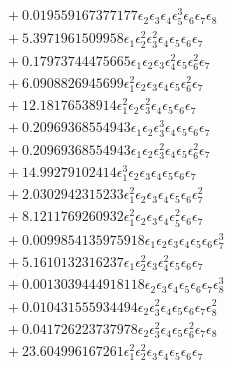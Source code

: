 \documentclass[10pt]{article}
\begin{document}
\begin{align*}
&{}  + 0.019559167377177 \epsilon_{2} \epsilon_{3} \epsilon_{4} \epsilon_{5}^{3} \epsilon_{6} \epsilon_{7} \epsilon_{8} \\
&{}  + 5.3971961509958 \epsilon_{1} \epsilon_{2}^{2} \epsilon_{3}^{2} \epsilon_{4} \epsilon_{5} \epsilon_{6} \epsilon_{7} \\
&{}  + 0.17973744475665 \epsilon_{1} \epsilon_{2} \epsilon_{3} \epsilon_{4}^{2} \epsilon_{5} \epsilon_{6}^{2} \epsilon_{7} \\
&{}  + 6.0908826945699 \epsilon_{1}^{2} \epsilon_{2} \epsilon_{3} \epsilon_{4} \epsilon_{5} \epsilon_{6}^{2} \epsilon_{7} \\
&{}  + 12.18176538914 \epsilon_{1}^{2} \epsilon_{2} \epsilon_{3}^{2} \epsilon_{4} \epsilon_{5} \epsilon_{6} \epsilon_{7} \\
&{}  + 0.20969368554943 \epsilon_{1} \epsilon_{2} \epsilon_{3}^{3} \epsilon_{4} \epsilon_{5} \epsilon_{6} \epsilon_{7} \\
&{}  + 0.20969368554943 \epsilon_{1} \epsilon_{2} \epsilon_{3}^{2} \epsilon_{4} \epsilon_{5} \epsilon_{6}^{2} \epsilon_{7} \\
&{}  + 14.99279102414 \epsilon_{1}^{3} \epsilon_{2} \epsilon_{3} \epsilon_{4} \epsilon_{5} \epsilon_{6} \epsilon_{7} \\
&{}  + 2.0302942315233 \epsilon_{1}^{2} \epsilon_{2} \epsilon_{3} \epsilon_{4} \epsilon_{5} \epsilon_{6} \epsilon_{7}^{2} \\
&{}  + 8.1211769260932 \epsilon_{1}^{2} \epsilon_{2} \epsilon_{3} \epsilon_{4} \epsilon_{5}^{2} \epsilon_{6} \epsilon_{7} \\
&{}  + 0.0099854135975918 \epsilon_{1} \epsilon_{2} \epsilon_{3} \epsilon_{4} \epsilon_{5} \epsilon_{6} \epsilon_{7}^{3} \\
&{}  + 5.1610132316237 \epsilon_{1} \epsilon_{2}^{2} \epsilon_{3} \epsilon_{4}^{2} \epsilon_{5} \epsilon_{6} \epsilon_{7} \\
&{}  + 0.0013039444918118 \epsilon_{2} \epsilon_{3} \epsilon_{4} \epsilon_{5} \epsilon_{6} \epsilon_{7} \epsilon_{8}^{3} \\
&{}  + 0.010431555934494 \epsilon_{2} \epsilon_{3}^{2} \epsilon_{4} \epsilon_{5} \epsilon_{6} \epsilon_{7} \epsilon_{8}^{2} \\
&{}  + 0.041726223737978 \epsilon_{2} \epsilon_{3}^{2} \epsilon_{4} \epsilon_{5} \epsilon_{6}^{2} \epsilon_{7} \epsilon_{8} \\
&{}  + 23.604996167261 \epsilon_{1}^{2} \epsilon_{2}^{2} \epsilon_{3} \epsilon_{4} \epsilon_{5} \epsilon_{6} \epsilon_{7} \\

\end{align*}
\end{document}
